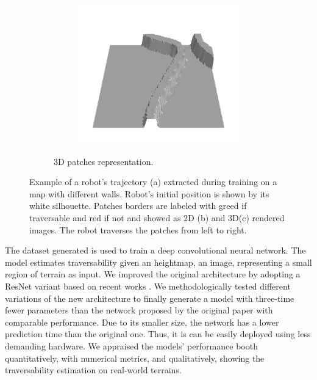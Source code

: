 \documentclass[../document.tex]{subfiles}
\begin{document}
\begin{figure} [htbp]
\begin{subfigure}[b]{1\textwidth}
\begin{subfigure}[b]{0.24\textwidth}
    \includegraphics[width=\linewidth]{../img/bars1-example-patches/3d/14.png}    
    \end{subfigure}  
\caption{3D patches representation.}
\label{fig : patch-extraction}
\end{subfigure}
\caption{Example of a robot's trajectory (a) extracted during training on a map with different walls. Robot's initial position is shown by its white silhouette. Patches borders are labeled with greed if traversable and red if not and showed as 2D (b) and 3D(c) rendered images. The robot traverses the patches from left to right.}
\end{figure}

The dataset generated is used to train a deep convolutional neural network. The model estimates traversability given an heightmap, an image, representing a small region of terrain as input. We improved the original architecture by adopting a ResNet variant based on recent works \cite{he2015deep} \cite{he2015identity} \cite{hu2017squeeze}. We methodologically tested different variations of the new architecture to finally generate a model with three-time fewer parameters than the network proposed by the original paper \cite{omar2018traversability} with comparable performance. Due to its smaller size, the network has a lower prediction time than the original one. Thus, it is can be easily deployed using less demanding hardware. We appraised the models' performance booth quantitatively, with numerical metrics, and qualitatively, showing the traversability estimation on real-world terrains.
\end{document}
